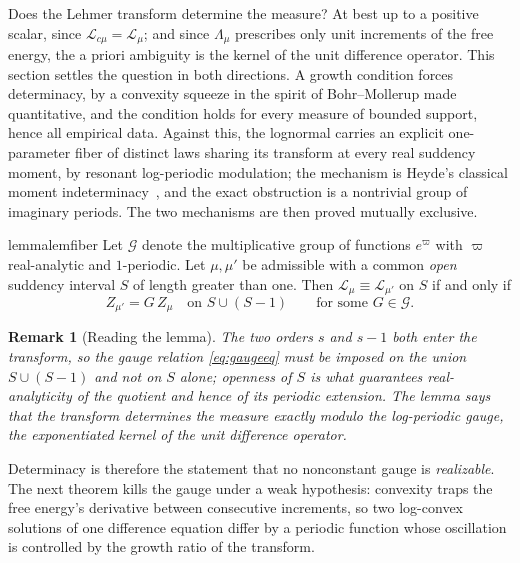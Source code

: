 \documentclass[sn-mathphys-num]{sn-jnl}
\theoremstyle{thmstyleone}%
\theoremstyle{thmstyletwo}%
\newtheorem{remark}{Remark}%
\theoremstyle{thmstylethree}%
\theoremstyle{thmstyleone}%
\providecommand{\Leh}{\mathscr{L}}
\begin{document}
	Does the Lehmer transform determine the measure? At best up to a
	positive scalar, since $\Leh_{c\mu}=\Leh_\mu$; and since
	$\Lambda_\mu$ prescribes only unit increments of the free energy,
	the a priori ambiguity is the kernel of the unit difference
	operator. This section settles the question in both directions. A
	growth condition forces determinacy, by a convexity squeeze in the
	spirit of Bohr--Mollerup made quantitative, and the condition holds
	for every measure of bounded support, hence all empirical data.
	Against this, the lognormal carries an explicit one-parameter fiber
	of distinct laws sharing its transform at every real suddency
	moment, by resonant log-periodic modulation; the mechanism is
	Heyde's classical moment indeterminacy~\cite{heyde1963}, and the
	exact obstruction is a nontrivial group of imaginary periods. The
	two mechanisms are then proved mutually exclusive.
	
	\begin{restatable}{lemma}{lemfiber}\label{lem:fiber}
		Let $\mathcal G$ denote the multiplicative group of functions
		$e^{\varpi}$ with $\varpi$ real-analytic and $1$-periodic. Let
		$\mu,\mu'$ be admissible with a common \emph{open} suddency
		interval $S$ of length greater than one. Then
		$\Leh_\mu\equiv\Leh_{\mu'}$ on $S$ if and only if
		\begin{equation}\label{eq:gaugeeq}
			Z_{\mu'}=G\,Z_\mu\quad\text{on }S\cup(S-1)
			\qquad\text{for some }G\in\mathcal G .
		\end{equation}
	\end{restatable}
	
	
	\begin{remark}[Reading the lemma]\label{rem:fiberread}
		The two orders $s$ and $s-1$ both enter the transform, so the
		gauge relation \eqref{eq:gaugeeq} must be imposed on the union
		$S\cup(S-1)$ and not on $S$ alone; openness of $S$ is what
		guarantees real-analyticity of the quotient and hence of its
		periodic extension. The lemma says that the transform determines
		the measure exactly modulo the log-periodic gauge, the
		exponentiated kernel of the unit difference operator.
	\end{remark}
	
	Determinacy is therefore the statement that no nonconstant gauge is
	\emph{realizable}. The next theorem kills the gauge under a weak
	hypothesis: convexity traps the free energy's derivative between
	consecutive increments, so two log-convex solutions of one
	difference equation differ by a periodic function whose oscillation
	is controlled by the growth ratio of the transform.
	
\end{document}
